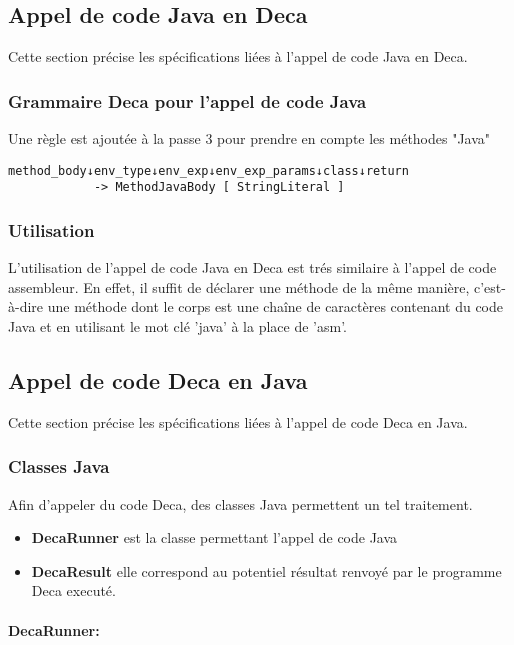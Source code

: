 \documentclass[12pt, a4paper, one side]{article}
\newcommand{\paragraphln}[1]{\paragraph{#1}\mbox{}\\}
\begin{document}
    \subsection{Appel de code Java en Deca}
    Cette section précise les spécifications liées à l'appel de code Java en Deca.
        \subsubsection{Grammaire Deca pour l'appel de code Java}
        Une règle est ajoutée à la passe 3 pour prendre en compte les méthodes "Java"
\begin{lstlisting}
method_body↓env_type↓env_exp↓env_exp_params↓class↓return
            -> MethodJavaBody [ StringLiteral ]
\end{lstlisting}

        \subsubsection{Utilisation}
        L'utilisation de l'appel de code Java en Deca est trés similaire à l'appel de code assembleur. En effet, il suffit de déclarer une méthode de la même manière, c'est-à-dire une méthode dont le corps est une chaîne de caractères contenant du code Java et en utilisant le mot clé 'java' à la place de 'asm'.

    \subsection{Appel de code Deca en Java}
    Cette section précise les spécifications liées à l'appel de code Deca en Java.
    \lstset{style=mystyle}

        \subsubsection{Classes Java}
        Afin d'appeler du code Deca, des classes Java permettent un tel traitement.

        \begin{itemize}
            \item \textbf{DecaRunner} est la classe permettant l'appel de code Java
            \item \textbf{DecaResult} elle correspond au potentiel résultat renvoyé par le programme Deca executé.
        \end{itemize}

        \paragraphln{DecaRunner:}
\end{document}
